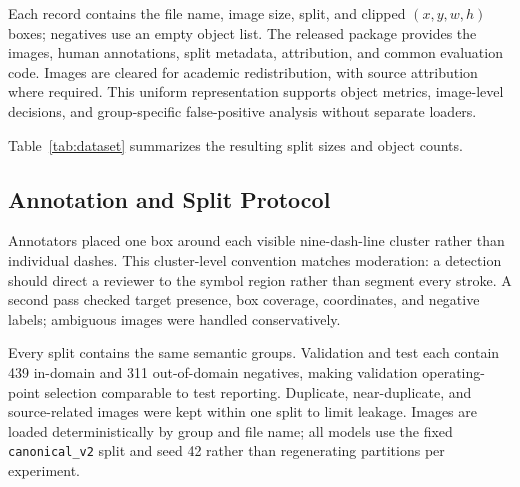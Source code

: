 \documentclass[conference,a4paper]{IEEEtran}
\begin{document}
Each record contains the file name, image size, split, and clipped $(x,y,w,h)$ boxes; negatives use an empty object list. The released package provides the images, human annotations, split metadata, attribution, and common evaluation code. Images are cleared for academic redistribution, with source attribution where required. This uniform representation supports object metrics, image-level decisions, and group-specific false-positive analysis without separate loaders.

Table~\ref{tab:dataset} summarizes the resulting split sizes and object counts.

\begin{table}[!h]
\centering
\caption{Dataset statistics by split.}
\label{tab:dataset}
\end{table}

\subsection{Annotation and Split Protocol}
Annotators placed one box around each visible nine-dash-line cluster rather than individual dashes. This cluster-level convention matches moderation: a detection should direct a reviewer to the symbol region rather than segment every stroke. A second pass checked target presence, box coverage, coordinates, and negative labels; ambiguous images were handled conservatively.

Every split contains the same semantic groups. Validation and test each contain 439 in-domain and 311 out-of-domain negatives, making validation operating-point selection comparable to test reporting. Duplicate, near-duplicate, and source-related images were kept within one split to limit leakage. Images are loaded deterministically by group and file name; all models use the fixed \texttt{canonical\_v2} split and seed 42 rather than regenerating partitions per experiment.
\end{document}
